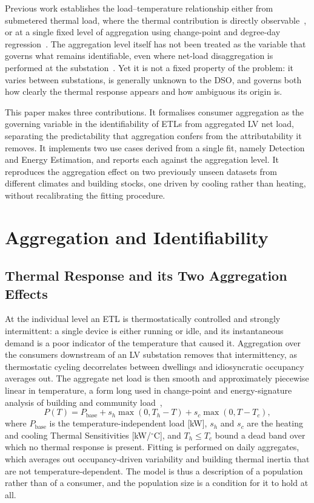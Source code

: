 \documentclass[9pt,journal,a4]{IEEEtran}
\begin{document}
Previous work establishes the load--temperature relationship either from submetered thermal load, where the thermal contribution is directly observable~\cite{Fei13, Wei20b, Bru23}, or at a single fixed level of aggregation using change-point and degree-day regression~\cite{Ruc92, Per17b}. The aggregation level itself has not been treated as the variable that governs what remains identifiable, even where net-load disaggregation is performed at the substation~\cite{Wan20}. Yet it is not a fixed property of the problem: it varies between substations, is generally unknown to the DSO, and governs both how clearly the thermal response appears and how ambiguous its origin is.

This paper makes three contributions. It formalises consumer aggregation as the governing variable in the identifiability of ETLs from aggregated LV net load, separating the predictability that aggregation confers from the attributability it removes. It implements two use cases derived from a single fit, namely Detection and Energy Estimation, and reports each against the aggregation level. It reproduces the aggregation effect on two previously unseen datasets from different climates and building stocks, one driven by cooling rather than heating, without recalibrating the fitting procedure.


\section{Aggregation and Identifiability}
\label{section:identify}

\subsection{Thermal Response and its Two Aggregation Effects}

At the individual level an ETL is thermostatically controlled and strongly intermittent: a single device is either running or idle, and its instantaneous demand is a poor indicator of the temperature that caused it. Aggregation over the consumers downstream of an LV substation removes that intermittency, as thermostatic cycling decorrelates between dwellings and idiosyncratic occupancy averages out. The aggregate net load is then smooth and approximately piecewise linear in temperature, a form long used in change-point and energy-signature analysis of building and community load~\cite{Ruc92, Ali11, Per17b},
\begin{equation}
P(T) = P_{\mathrm{base}} + s_h \max\left(0,T_h-T\right) + s_c \max\left(0,T-T_c\right),
\label{eq:thermal-response}
\end{equation}
where $P_{\mathrm{base}}$ is the temperature-independent load [kW], $s_h$ and $s_c$ are the heating and cooling Thermal Sensitivities [kW/$^\circ$C], and $T_h \leq T_c$ bound a dead band over which no thermal response is present. Fitting is performed on daily aggregates, which averages out occupancy-driven variability and building thermal inertia that are not temperature-dependent. The model is thus a description of a population rather than of a consumer, and the population size is a condition for it to hold at all.
\end{document}
